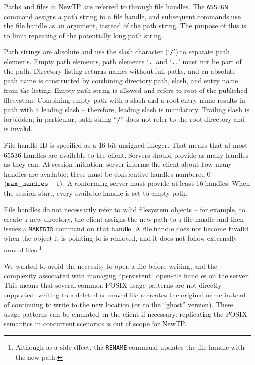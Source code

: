 Paths and files in NewTP are referred to through file handles. The {\tt ASSIGN} command assigns a path string
to a file handle, and subsequent commands use the file handle as an argument, instead of the path string. The
purpose of this is to limit repeating of the potentially long path string.

Path strings are absolute and use the slash character (`{\tt /}') to separate path elements. Empty path
elements, path elements `{\tt .}' and `{\tt ..}' must not be part of the path. Directory listing returns names
without full paths, and an absolute path name is constructed by combining directory path, slash, and entry
name from the listing. Empty path string is allowed and refers to root of the published filesystem. Combining
empty path with a slash and a root entry name results in path with a leading slash -- therefore, leading slash
is mandatory. Trailing slash is forbidden; in particular, path string ``{\tt /}'' does not refer to the root
directory and is invalid.

File handle ID is specified as a 16-bit unsigned integer. That means that at most 65536 handles are available
to the client. Servers should provide as many handles as they can. At session initiation, server informs the
client about how many handles are available; these must be consecutive handles numbered 0--$({\tt max\_handles}
- 1)$. A conforming server must provide at least 16 handles. When the session start, every available handle is
set to empty path.

File handles do not necessarily refer to valid filesystem objects -- for example, to create a new directory,
the client assigns the new path to a file handle and then issues a {\tt MAKEDIR} command on that handle.
A file handle does not become invalid when the object it is pointing to is removed, and it does not follow
externally moved files.\footnote{Although as a side-effect, the {\tt RENAME} command updates the file handle
with the new path.}

We wanted to avoid the necessity to open a file before writing, and the complexity associated with managing
``persistent'' open-file handles on the server. This means that several common POSIX usage patterns are not
directly supported: writing to a deleted or moved file recreates the original name instead of continuing to
write to the new location (or to the ``ghost'' version). These usage patterns can be emulated on the client if
necessary; replicating the POSIX semantics in concurrent scenarios is out of scope for NewTP.

